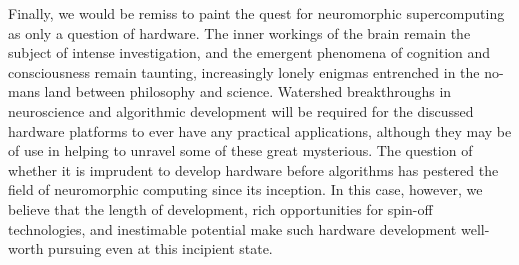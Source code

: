 \documentclass[twocolumn]{article}
\begin{document}
Finally, we would be remiss to paint the quest for neuromorphic supercomputing as only a question of hardware. The inner workings of the brain remain the subject of intense investigation, and the emergent phenomena of cognition and consciousness remain taunting, increasingly lonely enigmas entrenched in the no-mans land between philosophy and science. Watershed breakthroughs in neuroscience and algorithmic development will be required for the discussed hardware platforms to ever have any practical applications, although they may be of use in helping to unravel some of these great mysterious. The question of whether it is imprudent to develop hardware before algorithms has pestered the field of neuromorphic computing since its inception. In this case, however, we believe that the length of development, rich opportunities for spin-off technologies, and inestimable potential make such hardware development well-worth pursuing even at this incipient state.  



\end{document}
